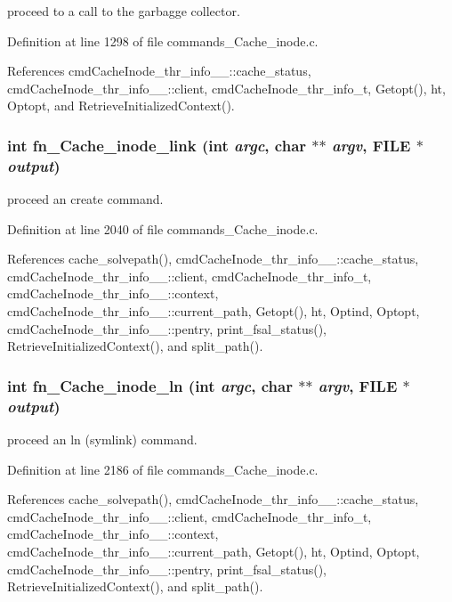 proceed to a call to the garbagge collector. 

Definition at line 1298 of file commands\_\-Cache\_\-inode.c.

References cmd\-Cache\-Inode\_\-thr\_\-info\_\-\_\-::cache\_\-status, cmd\-Cache\-Inode\_\-thr\_\-info\_\-\_\-::client, cmd\-Cache\-Inode\_\-thr\_\-info\_\-t, Getopt(), ht, Optopt, and Retrieve\-Initialized\-Context().
\subsubsection{\setlength{\rightskip}{0pt plus 5cm}int fn\_\-Cache\_\-inode\_\-link (int {\em argc}, char $\ast$$\ast$ {\em argv}, FILE $\ast$ {\em output})}\label{commands_8h_a42}


proceed an create command. 

Definition at line 2040 of file commands\_\-Cache\_\-inode.c.

References cache\_\-solvepath(), cmd\-Cache\-Inode\_\-thr\_\-info\_\-\_\-::cache\_\-status, cmd\-Cache\-Inode\_\-thr\_\-info\_\-\_\-::client, cmd\-Cache\-Inode\_\-thr\_\-info\_\-t, cmd\-Cache\-Inode\_\-thr\_\-info\_\-\_\-::context, cmd\-Cache\-Inode\_\-thr\_\-info\_\-\_\-::current\_\-path, Getopt(), ht, Optind, Optopt, cmd\-Cache\-Inode\_\-thr\_\-info\_\-\_\-::pentry, print\_\-fsal\_\-status(), Retrieve\-Initialized\-Context(), and split\_\-path().
\subsubsection{\setlength{\rightskip}{0pt plus 5cm}int fn\_\-Cache\_\-inode\_\-ln (int {\em argc}, char $\ast$$\ast$ {\em argv}, FILE $\ast$ {\em output})}\label{commands_8h_a46}


proceed an ln (symlink) command. 

Definition at line 2186 of file commands\_\-Cache\_\-inode.c.

References cache\_\-solvepath(), cmd\-Cache\-Inode\_\-thr\_\-info\_\-\_\-::cache\_\-status, cmd\-Cache\-Inode\_\-thr\_\-info\_\-\_\-::client, cmd\-Cache\-Inode\_\-thr\_\-info\_\-t, cmd\-Cache\-Inode\_\-thr\_\-info\_\-\_\-::context, cmd\-Cache\-Inode\_\-thr\_\-info\_\-\_\-::current\_\-path, Getopt(), ht, Optind, Optopt, cmd\-Cache\-Inode\_\-thr\_\-info\_\-\_\-::pentry, print\_\-fsal\_\-status(), Retrieve\-Initialized\-Context(), and split\_\-path().
